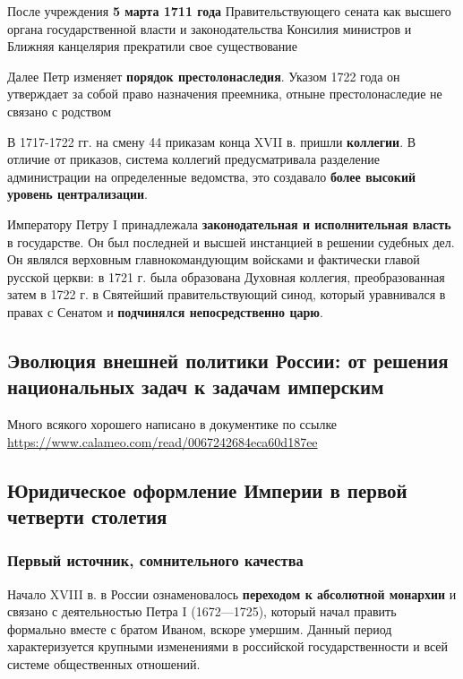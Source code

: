 \documentclass{article}
\begin{document}
После учреждения \textbf{5 марта 1711 года} Правительствующего сената как высшего органа государственной власти и законодательства Консилия министров и Ближняя канцелярия прекратили свое существование

\hfill

Далее Петр изменяет \textbf{порядок престолонаследия}. Указом 1722 года он утверждает за собой право назначения преемника, отныне престолонаследие не связано с родством

В 1717-1722 гг. на смену 44 приказам конца XVII в. пришли \textbf{коллегии}. В отличие от приказов, система коллегий предусматривала разделение администрации на определенные ведомства, это создавало \textbf{более высокий уровень централизации}.

\hfill

Императору Петру I принадлежала \textbf{законодательная и исполнительная власть} в государстве. Он был последней и высшей инстанцией в решении судебных дел. Он являлся верховным главнокомандующим войсками и фактически главой русской церкви: в 1721 г. была образована Духовная коллегия, преобразованная затем в 1722 г. в Святейший правительствующий синод, который уравнивался в правах с Сенатом и \textbf{подчинялся непосредственно царю}.


\pagebreak
\subsection{Эволюция внешней политики России: от решения национальных задач к задачам имперским}

Много всякого хорошего написано в документике по ссылке \url{https://www.calameo.com/read/0067242684eca60d187ee}


\pagebreak
\subsection{Юридическое оформление Империи в первой четверти столетия}

\subsubsection{Первый источник, сомнительного качества}

Начало XVIII в. в России ознаменовалось \textbf{переходом к абсолютной монархии} и связано с деятельностью Петра I (1672—1725), который начал править формально вместе с братом Иваном, вскоре умершим. Данный период характеризуется крупными изменениями в российской государственности и всей системе общественных отношений.
\end{document}
